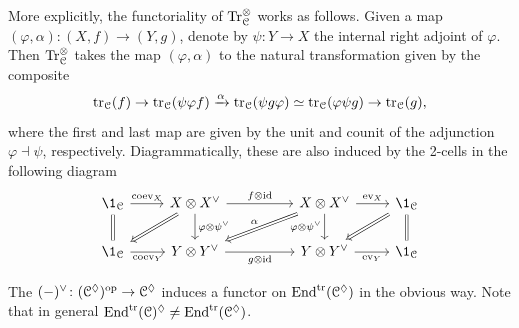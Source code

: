 More explicitly, the functoriality of $\mathrm{Tr}^{\otimes}_{\mathcal{C}}$ works as follows.
Given a map $(\varphi, \alpha)\colon (X,f) \to (Y,g)$, denote by $\psi \colon Y\to X$ the internal right adjoint of $\varphi$.
Then $\mathrm{Tr}^{\otimes}_{\mathcal{C}}$ takes the map $(\varphi,\alpha)$ to the natural transformation given by the composite
\[ \mathrm{tr}_{\mathcal{C}} (f) \to \mathrm{tr}_{\mathcal{C}} (\psi \varphi f) \xrightarrow{\alpha} \mathrm{tr}_{\mathcal{C}} (\psi g \varphi)
\simeq \mathrm{tr}_{\mathcal{C}} (\varphi \psi g) \to \mathrm{tr}_{\mathcal{C}} (g),\]
where the first and last map are given by the unit and counit of the adjunction
$\varphi \dashv \psi$, respectively. Diagrammatically, these are also induced by the 2-cells
in the following diagram
\begin{equation}\label{eq: trace functoriality}
  \begin{tikzcd}
	{\1_\cC} & {X \otimes X^\vee} && {X\otimes X^\vee} & {\1_\cC} \\
	{\1_\cC} & {Y\otimes Y^\vee} && {Y \otimes Y^\vee} & {\1_\cC}
	\arrow["{\rm{coev}_X}", from=1-1, to=1-2]
	\arrow[equals, from=1-1, to=2-1]
	\arrow["{f\otimes \id}", from=1-2, to=1-4]
	\arrow[Rightarrow, from=1-2, to=2-1]
	\arrow["{\varphi \otimes \psi^\vee}", from=1-2, to=2-2]
	\arrow["{\ev_X}", from=1-4, to=1-5]
	\arrow["\alpha"', Rightarrow, from=1-4, to=2-2]
	\arrow["{\varphi \otimes \psi^\vee}"', from=1-4, to=2-4]
	\arrow[Rightarrow, from=1-5, to=2-4]
	\arrow[equals, from=1-5, to=2-5]
	\arrow["{\rm{coev}_Y}"', from=2-1, to=2-2]
	\arrow["{g\otimes \id}"', from=2-2, to=2-4]
	\arrow["{\ev_Y}"', from=2-4, to=2-5]
\end{tikzcd}\end{equation}


The $(-)^{\vee}\colon (\mathcal{C}^{\lozenge})^{{\mathrm{op}}}\to \mathcal{C}^{\lozenge}$ induces a functor on
$\mathrm{End}^{\mathrm{tr}}(\mathcal{C}^{\lozenge})$ in the obvious way. Note that in general $\mathrm{End}^{\mathrm{tr}}(\mathcal{C})^{\lozenge}\neq \mathrm{End}^{\mathrm{tr}}(\mathcal{C}^{\lozenge})$.

